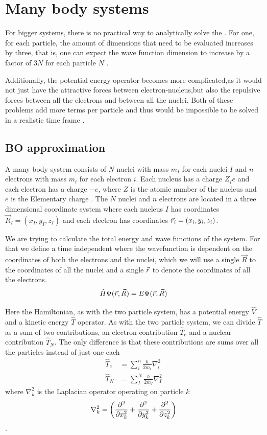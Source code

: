 \documentclass[../master_thesis.tex]{subfiles}
\begin{document}
\section{Many body systems}

For bigger systems, there is no practical way to analytically solve the
\SE \cite{Jensen:2017}. For one, for each particle, the amount of dimensions that need to be
evaluated increases by three, that is, one can expect the wave function
dimension to increase by a factor of $3N$ for each particle $N$
\cite{Cramer:2004}.

Additionally, the potential energy operator becomes more complicated,as it
would not just have the attractive forces between electron-nucleus,but also the
repulsive forces between all the electrons and between all the nuclei. Both of
these problems add more terms per particle and thus would be impossible to be
solved in a realistic time frame \cite{Jensen:2017}.

\subsection{\ac{BO} approximation} \label{BO}
A many body system consists of $N$ nuclei with mass $m_I$ for each nuclei $I$
and $n$ electrons with mass $m_i$ for each electron $i$. Each nucleus has a
charge $Z_Ie$ and each electron has a charge $-e$, where $Z$ is the atomic
number of the nucleus  and $e$ is the Elementary charge \cite{Atkins:2014}. The $N$ nuclei and $n$
electrons are located in a three dimensional coordinate system where each nucleus $I$ has
coordinates $\vec{R}_I = (x_I, y_I, z_I)$ and each electron has coordinates
$\vec{r}_i = (x_i, y_i, z_i)$.

We are trying to calculate the total energy and wave functions of the system. For
that we define a time independent \SE where the wavefunction is dependent on
the coordinates of both the electrons and the nuclei, which we will use a single $\vec{R}$
to the coordinates of all the nuclei and a single $\vec{r}$ to denote the coordinates
of all the electrons.
\begin{equation}\label{eq:totalheliumSE}
  \hat{H}\Psi(\vec{r}, \vec{R}) = E \Psi(\vec{r}, \vec{R})
\end{equation}

Here the Hamiltonian, as with the two particle system, has a potential energy $\hat{V}$ and a
kinetic energy $\hat{T}$ operator. As with the two particle system, we can divide $\hat{T}$ as
a sum of two contributions, an electron contribution $\hat{T}_e$ and a nuclear contribution
$\hat{T}_N$. The only difference is that these contributions are sums over all
the particles  instead of just one each\cite{Cramer:2004}
\begin{align}
  \hat{T}_e &= \sum_i^n \frac{\hbar}{2m_i}\nabla^2_i\\
  \hat{T}_N &= \sum_I^N \frac{\hbar}{2m_I}\nabla^2_I
\end{align}
where $\nabla^2_k$ is the Laplacian operator operating on particle $k$
\begin{equation}
  \nabla^2_k = \left( \frac{\partial^2}{\partial x_k^2} + \frac{\partial^2}{\partial y_k^2} + \frac{\partial^2}{\partial z_k^2} \right)
\end{equation}.
\end{document}
